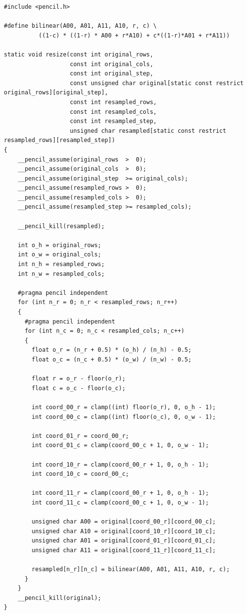 \documentclass{carp}
\begin{document}
\begin{lstlisting}[language=pencil,escapechar=@]
#include <pencil.h>

#define bilinear(A00, A01, A11, A10, r, c) \
          ((1-c) * ((1-r) * A00 + r*A10) + c*((1-r)*A01 + r*A11))

static void resize(const int original_rows,
                   const int original_cols,
                   const int original_step,
                   const unsigned char original[static const restrict original_rows][original_step],
                   const int resampled_rows,
                   const int resampled_cols,
                   const int resampled_step,
                   unsigned char resampled[static const restrict resampled_rows][resampled_step])
{
    __pencil_assume(original_rows  >  0);
    __pencil_assume(original_cols  >  0);
    __pencil_assume(original_step  >= original_cols);
    __pencil_assume(resampled_rows >  0);
    __pencil_assume(resampled_cols >  0);
    __pencil_assume(resampled_step >= resampled_cols);

    __pencil_kill(resampled);

    int o_h = original_rows;
    int o_w = original_cols;
    int n_h = resampled_rows;
    int n_w = resampled_cols;

    #pragma pencil independent
    for (int n_r = 0; n_r < resampled_rows; n_r++)
    {
      #pragma pencil independent
      for (int n_c = 0; n_c < resampled_cols; n_c++)
      {
        float o_r = (n_r + 0.5) * (o_h) / (n_h) - 0.5;
        float o_c = (n_c + 0.5) * (o_w) / (n_w) - 0.5;

        float r = o_r - floor(o_r);
        float c = o_c - floor(o_c);

        int coord_00_r = clamp((int) floor(o_r), 0, o_h - 1);
        int coord_00_c = clamp((int) floor(o_c), 0, o_w - 1);

        int coord_01_r = coord_00_r;
        int coord_01_c = clamp(coord_00_c + 1, 0, o_w - 1);

        int coord_10_r = clamp(coord_00_r + 1, 0, o_h - 1);
        int coord_10_c = coord_00_c;

        int coord_11_r = clamp(coord_00_r + 1, 0, o_h - 1);
        int coord_11_c = clamp(coord_00_c + 1, 0, o_w - 1);

        unsigned char A00 = original[coord_00_r][coord_00_c];
        unsigned char A10 = original[coord_10_r][coord_10_c];
        unsigned char A01 = original[coord_01_r][coord_01_c];
        unsigned char A11 = original[coord_11_r][coord_11_c];

        resampled[n_r][n_c] = bilinear(A00, A01, A11, A10, r, c);
      }
    }
    __pencil_kill(original);
}
\end{lstlisting}
\end{document}
